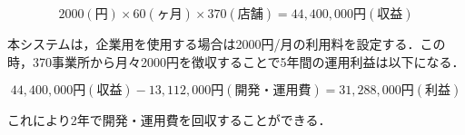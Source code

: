 \[2000(円)\times 60(ヶ月)\times 370(店舗)=44,400,000円(収益)\]


本システムは，企業用を使用する場合は2000円/月の利用料を設定する．この時，370事業所から月々2000円を徴収することで5年間の運用利益は以下になる．\par

\[44,400,000円(収益)-13,112,000円(開発・運用費)=31,288,000円(利益)\]

これにより2年で開発・運用費を回収することができる．








